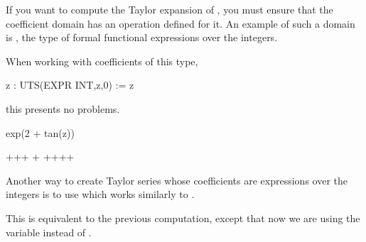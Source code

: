 {{{{{{{{{{{{{{If you want to compute the Taylor expansion of , you must
ensure that the coefficient domain has an operation  defined
for it.
An example of such a domain is , the type
of formal functional expressions over the integers.
%
\begin{xtc}
\begin{xtccomment}
When working with coefficients of this type,
\end{xtccomment}
\begin{spadsrc}
z : UTS(EXPR INT,z,0) := z 
\end{spadsrc}
\begin{TeXOutput}
\begin{fricasmath}{9}
%
\end{fricasmath}
\end{TeXOutput}
\end{xtc}
\begin{xtc}
\begin{xtccomment}
this presents no problems.
\end{xtccomment}
\begin{spadsrc}
exp(2 + tan(z)) 
\end{spadsrc}
\begin{TeXOutput}
\begin{fricasmath}{10}
+\TIMES {}+\TIMES {}+%
\TIMES {}+\TIMES %
+\TIMES {}+\TIMES {}+\TIMES {}+%
%
\end{fricasmath}
\end{TeXOutput}
\end{xtc}
%
Another way to create Taylor series whose coefficients are expressions over
the integers is to use  which works similarly to
.
%
\begin{xtc}
\begin{xtccomment}
This is equivalent to the previous computation, except that now we
are using the variable  instead of .
\end{xtccomment}

\end{xtc}}}}}}}}}}}}}}}
